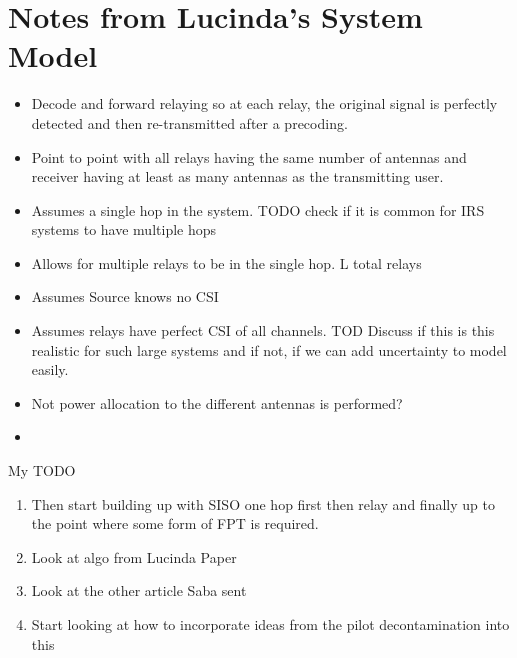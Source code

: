 \documentclass[12pt,a4paper]{report}
\begin{document}
\section{Notes from Lucinda's System Model}
\begin{itemize}
\item Decode and forward relaying so at each relay, the original signal is perfectly detected and then re-transmitted after a precoding. 
\item Point to point with all relays having the same number of antennas and receiver having at least as many antennas as the transmitting user.
\item Assumes a single hop in the system. TODO check if it is common for IRS systems to have multiple hops
\item Allows for multiple relays to be in the single hop. L total relays
\item Assumes Source knows no CSI
\item Assumes relays have perfect CSI of all channels. TOD Discuss if this is this realistic for such large systems and if not, if we can add uncertainty to model easily.
\item Not power allocation to the different antennas is performed?
\item 
\end{itemize}
My TODO
\begin{enumerate}
	\item
		Then start building up with SISO one hop first then relay and finally up to the point where some form of FPT is
		required.
	\item
		Look at algo from Lucinda Paper
	\item
		Look at the other article Saba sent
	\item
		Start looking at how to incorporate ideas from the pilot decontamination into this
\end{enumerate}
\end{document}

